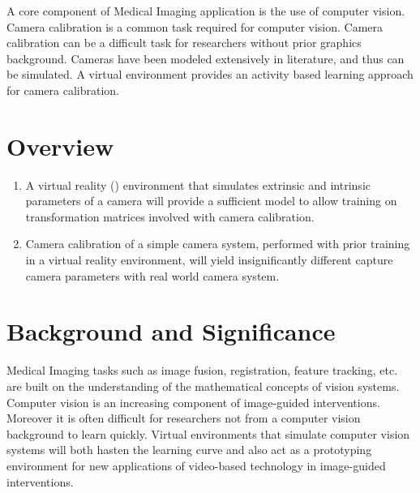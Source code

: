 \documentclass[11pt]{report}
\begin{document}
A core component of Medical Imaging application is the use of computer vision. Camera calibration is a common task required for computer vision. Camera calibration can be a difficult task for researchers without prior graphics background. Cameras have been modeled extensively in literature, and thus can be simulated. A virtual environment provides an activity based learning approach for camera calibration. 
     
\section{Overview}

     
\begin{enumerate}
\item A virtual reality () environment that simulates extrinsic and intrinsic parameters of a camera will provide a sufficient model to allow training on transformation matrices involved with camera calibration.
\item Camera calibration of a simple camera system, performed with prior training in a virtual reality environment, will yield insignificantly different capture camera parameters with real world camera system. 
\end{enumerate}

\section{Background and Significance}

Medical Imaging tasks such as image fusion, registration, feature tracking, etc. are built on the understanding of the mathematical concepts of vision systems. Computer vision is an increasing component of image-guided interventions. Moreover it is often difficult for researchers not from a computer vision background to learn quickly. Virtual environments that simulate computer vision systems will both hasten the learning curve and also act as a prototyping environment for new applications of video-based technology in image-guided interventions. 

\end{document}
